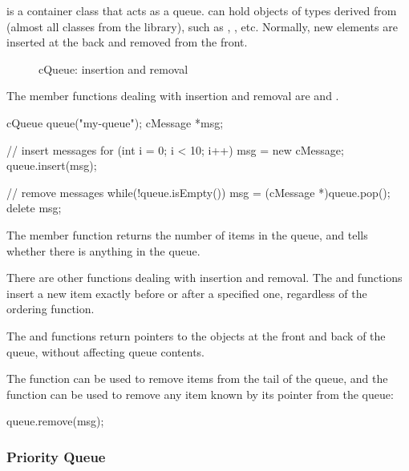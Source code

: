  is a container class that acts as a queue.
 can hold objects of types derived from 
(almost all classes from the {\opp} library), such as
, , etc. Normally, new elements
are inserted at the back and removed from the front.

\begin{figure}[htbp]
  \begin{center}
    
    \caption{cQueue: insertion and removal}
    \label{fig:ch-sim-lib:cqueue}
  \end{center}
\end{figure}

The member functions dealing with insertion and removal are
 and .

\begin{cpp}
cQueue queue("my-queue");
cMessage *msg;

// insert messages
for (int i = 0; i < 10; i++) {
    msg = new cMessage;
    queue.insert(msg);
}

// remove messages
while(!queue.isEmpty()) {
    msg = (cMessage *)queue.pop();
    delete msg;
}
\end{cpp}

The  member function returns the number of items in the
queue, and  tells whether there is anything in the queue.

There are other functions dealing with insertion and removal. The
 and  functions insert a
new item exactly before or after a specified one, regardless of the
ordering function.

The  and  functions return pointers to the objects
at the front and back of the queue, without affecting queue contents.

The  function can be used to remove items from the
tail of the queue, and the  function can be
used to remove any item known by its pointer from the queue:

\begin{cpp}
queue.remove(msg);
\end{cpp}


\subsubsection{Priority Queue}
\label{sec:sim-lib:cqueue-as-priority-queue}

